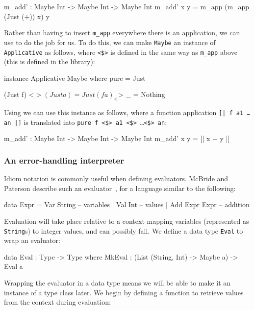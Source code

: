 \begin{code}
m_add' : Maybe Int -> Maybe Int -> Maybe Int
m_add' x y = m_app (m_app (Just (+)) x) y
\end{code} 

\noindent
Rather than having to insert \texttt{m\_app} everywhere there is an
application, we can use  to do the job for us.  To do
this, we can make \texttt{Maybe} an instance of \texttt{Applicative} as
follows, where \texttt{<\$>} is defined in the same way as \texttt{m\_app}
above (this is defined in the \Idris{} library):

\begin{code}
instance Applicative Maybe where
    pure = Just

    (Just f) <$> (Just a) = Just (f a)
    _        <$> _        = Nothing
\end{code} 

\noindent
Using  we can use this instance as follows, where a
function application \texttt{[| f a1 \dots an |]} is translated into
\texttt{pure f <\$> a1 <\$> \dots <\$> an}:

\begin{code}
m_add' : Maybe Int -> Maybe Int -> Maybe Int
m_add' x y = [| x + y |]
\end{code} 

\subsubsection{An error-handling interpreter}

Idiom notation is commonly useful when defining evaluators.
McBride and Paterson describe such an evaluator~\cite{idioms}, for a language similar to the following:

\begin{code}
data Expr = Var String      -- variables
          | Val Int         -- values
          | Add Expr Expr   -- addition
\end{code} 

\noindent
Evaluation will take place relative to a context mapping variables (represented as \texttt{String}s) to integer values, and can possibly fail.
We define a data type \texttt{Eval} to wrap an evaluator:

\begin{code}
data Eval : Type -> Type where
     MkEval : (List (String, Int) -> Maybe a) -> Eval a
\end{code} 

\noindent
Wrapping the evaluator in a data type means we will be able to make it an instance of a type class later. We begin by defining a function to retrieve values from the context during evaluation:


